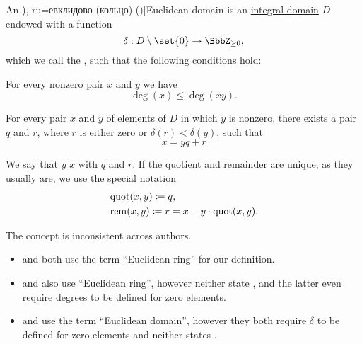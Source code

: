 \begin{definition}\label{def:euclidean_domain}
  An \term[bg=евклидов (пръстен) (\cite[def. VI.2]{ГеновМиховскиМоллов1991Алгебра}), ru=евклидово (кольцо) (\cite[def. 3.5.2]{Винберг2014КурсАлгебры})]{Euclidean domain} is an \hyperref[def:integral_domain]{integral domain} \( D \) endowed with a function
  \begin{equation*}
    \delta: D \setminus \set{ 0 } \to \BbbZ_{\geq 0},
  \end{equation*}
  which we call the , such that the following conditions hold:
  \begin{thmenum}
      For every nonzero pair \( x \) and \( y \) we have
    \begin{equation}\label{eq:def:euclidean_domain/multiplication}
      \deg(x) \leq \deg(xy).
    \end{equation}

     For every pair \( x \) and \( y \) of elements of \( D \) in which \( y \) is nonzero, there exists a pair \( q \) and \( r \), where \( r \) is either zero or \( \delta(r) < \delta(y) \), such that
    \begin{equation}\label{eq:def:euclidean_domain/division}
      x = yq + r
    \end{equation}
  \end{thmenum}

  We say that \( y \)  \( x \) with  \( q \) and  \( r \). If the quotient and remainder are unique, as they usually are, we use the special notation
  \begin{align*}
    &\operatorname{quot}(x, y) \coloneqq q, \\
    &\operatorname{rem}(x, y) \coloneqq r = x - y \cdot \operatorname{quot}(x, y).
  \end{align*}
\end{definition}
\begin{comments}
  \item The concept is inconsistent across authors.
  \begin{itemize}
    \item {} and  both use the term \enquote{Euclidean ring} for our definition.

    \item {} and  also use \enquote{Euclidean ring}, however neither state , and the latter even require degrees to be defined for zero elements.

    \item {} and  use the term \enquote{Euclidean domain}, however they both require \( \delta \) to be defined for zero elements and neither states .
  \end{itemize}
\end{comments}

